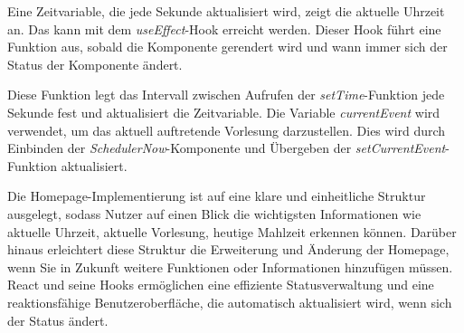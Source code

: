 Eine Zeitvariable, die jede Sekunde aktualisiert wird, zeigt die aktuelle Uhrzeit an. Das kann mit dem \emph{useEffect}-Hook erreicht werden. Dieser Hook führt eine Funktion aus, sobald die Komponente gerendert wird und wann immer sich der Status der Komponente ändert.

Diese Funktion legt das Intervall zwischen Aufrufen der \emph{setTime}-Funktion jede Sekunde fest und aktualisiert die Zeitvariable. Die Variable \emph{currentEvent} wird verwendet, um das aktuell auftretende Vorlesung darzustellen. Dies wird durch Einbinden der \emph{SchedulerNow}-Komponente und Übergeben der \emph{setCurrentEvent}-Funktion aktualisiert.

Die Homepage-Implementierung ist auf eine klare und einheitliche Struktur ausgelegt, sodass Nutzer auf einen Blick die wichtigsten Informationen wie aktuelle Uhrzeit, aktuelle Vorlesung, heutige Mahlzeit erkennen können. Darüber hinaus erleichtert diese Struktur die Erweiterung und Änderung der Homepage, wenn Sie in Zukunft weitere Funktionen oder Informationen hinzufügen müssen. React und seine Hooks ermöglichen eine effiziente Statusverwaltung und eine reaktionsfähige Benutzeroberfläche, die automatisch aktualisiert wird, wenn sich der Status ändert.

